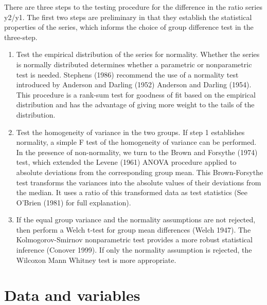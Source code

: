 \documentclass[
  letterpaper,
  DIV=11,
  numbers=noendperiod]{scrartcl}
\begin{document}
There are three steps to the testing procedure for the difference in the
ratio series y2/y1. The first two steps are preliminary in that they
establish the statistical properties of the series, which informs the
choice of group difference test in the three-step.

\begin{enumerate}
\def\labelenumi{\arabic{enumi}.}
\item
  Test the empirical distribution of the series for normality. Whether
  the series is normally distributed determines whether a parametric or
  nonparametric test is needed. Stephens (1986) recommend the use of a
  normality test introduced by Anderson and Darling (1952) Anderson and
  Darling (1954). This procedure is a rank-sum test for goodness of fit
  based on the empirical distribution and has the advantage of giving
  more weight to the tails of the distribution.
\item
  Test the homogeneity of variance in the two groups. If step 1
  establishes normality, a simple F test of the homogeneity of variance
  can be performed. In the presence of non-normality, we turn to the
  Brown and Forsythe (1974) test, which extended the Levene (1961) ANOVA
  procedure applied to absolute deviations from the corresponding group
  mean. This Brown-Forsythe test transforms the variances into the
  absolute values of their deviations from the median. It uses a ratio
  of this transformed data as test statistics (See O'Brien (1981) for
  full explanation).
\item
  If the equal group variance and the normality assumptions are not
  rejected, then perform a Welch t-test for group mean differences
  (Welch 1947). The Kolmogorov-Smirnov nonparametric test provides a
  more robust statistical inference (Conover 1999). If only the
  normality assumption is rejected, the Wilcoxon Mann Whitney test is
  more appropriate.
\end{enumerate}

\hypertarget{data-and-variables}{%
\section{Data and variables}\label{data-and-variables}}
\end{document}
